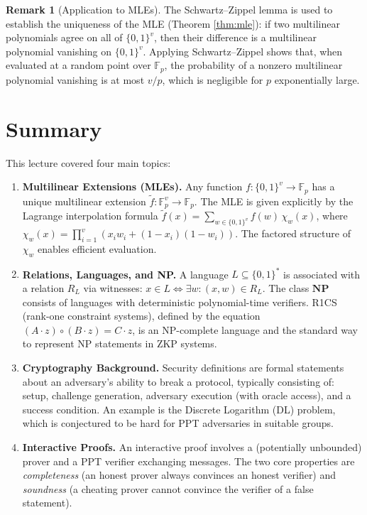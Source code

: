 \documentclass[11pt]{article}
\theoremstyle{plain}
\theoremstyle{definition}
\newtheorem{remark}[theorem]{Remark}
\begin{document}
\begin{remark}[Application to MLEs]
The Schwartz--Zippel lemma is used to establish the uniqueness of the MLE (Theorem
\ref{thm:mle}): if two multilinear polynomials agree on all of $\{0,1\}^v$, then their
difference is a multilinear polynomial vanishing on $\{0,1\}^v$.
Applying Schwartz--Zippel shows that, when evaluated at a random point over $\mathbb{F}_p$,
the probability of a nonzero multilinear polynomial vanishing is at most $v/p$, which is
negligible for $p$ exponentially large.
\end{remark}

\section*{Summary}

This lecture covered four main topics:

\begin{enumerate}[leftmargin=2em]
  \item \textbf{Multilinear Extensions (MLEs).}
        Any function $f : \{0,1\}^v \to \mathbb{F}_p$ has a unique multilinear extension
        $\widetilde{f} : \mathbb{F}_p^v \to \mathbb{F}_p$.  The MLE is given explicitly by
        the Lagrange interpolation formula
        $\widetilde{f}(x) = \sum_{w \in \{0,1\}^v} f(w)\,\chi_w(x)$,
        where $\chi_w(x) = \prod_{i=1}^v (x_i w_i + (1-x_i)(1-w_i))$.
        The factored structure of $\chi_w$ enables efficient evaluation.

  \item \textbf{Relations, Languages, and NP.}
        A language $L \subseteq \{0,1\}^*$ is associated with a relation $R_L$ via
        witnesses: $x \in L \iff \exists w : (x,w) \in R_L$.
        The class $\mathbf{NP}$ consists of languages with deterministic polynomial-time
        verifiers.
        R1CS (rank-one constraint systems), defined by the equation
        $(A \cdot z) \circ (B \cdot z) = C \cdot z$, is an NP-complete language and
        the standard way to represent NP statements in ZKP systems.

  \item \textbf{Cryptography Background.}
        Security definitions are formal statements about an adversary's ability to break
        a protocol, typically consisting of: setup, challenge generation, adversary
        execution (with oracle access), and a success condition.
        An example is the Discrete Logarithm (DL) problem, which is conjectured to be
        hard for PPT adversaries in suitable groups.

  \item \textbf{Interactive Proofs.}
        An interactive proof involves a (potentially unbounded) prover and a PPT verifier
        exchanging messages.
        The two core properties are \emph{completeness} (an honest prover always convinces
        an honest verifier) and \emph{soundness} (a cheating prover cannot convince the
        verifier of a false statement).
\end{enumerate}
\end{document}
